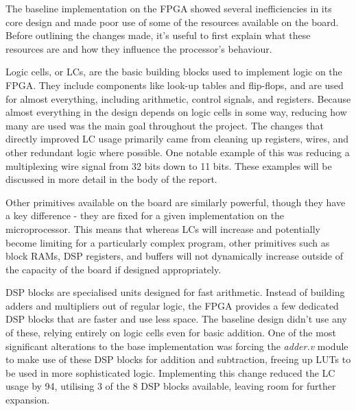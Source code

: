 \documentclass[a4paper,10pt]{article}
\begin{document}
The baseline implementation on the FPGA showed several inefficiencies 
in its core design and made poor use of 
some of the resources available on the board. 
Before outlining the changes made, it's useful to first explain 
what these resources are and how they influence the processor's behaviour.

Logic cells, or LCs, are the basic building blocks used to 
implement logic on the FPGA. 
They include components like look-up tables and flip-flops, 
and are used for almost everything, including 
arithmetic, control signals, and registers. 
Because almost everything in the design depends on logic cells in some way, 
reducing how many are used was the main goal throughout the project.
The changes that directly improved LC usage primarily came from
cleaning up registers, wires, and other redundant logic where possible.
One notable example of this was reducing a multiplexing wire signal
from 32 bits down to 11 bits. These examples will be discussed in more detail
in the body of the report.

Other primitives available on the board are similarly powerful,
though they have a key difference - they are fixed for a given implementation
on the microprocessor.
This means that whereas LCs will increase and potentially become limiting
for a particularly complex program, 
other primitives such as block RAMs, DSP registers, and buffers
will not dynamically increase outside of 
the capacity of the board if designed appropriately.

DSP blocks are specialised units designed for fast arithmetic. 
Instead of building adders and multipliers out of regular logic, 
the FPGA provides a few dedicated DSP blocks that are faster and use less space. 
The baseline design didn't use any of these, 
relying entirely on logic cells even for basic addition. 
One of the most significant alterations to the base implementation
was forcing the \textit{adder.v} module to make use of these DSP blocks
for addition and subtraction, 
freeing up LUTs to be used in more sophisticated logic.
Implementing this change reduced the LC usage by 94, 
utilising 3 of the 8 DSP blocks available,
leaving room for further expansion.
\end{document}
